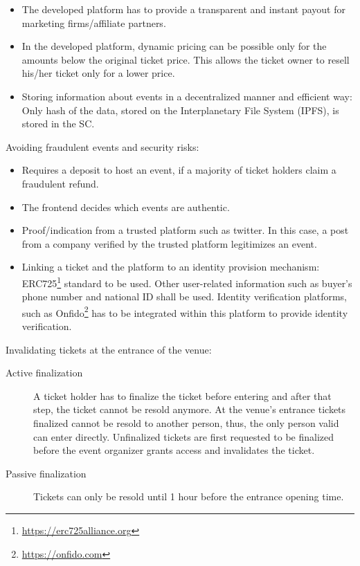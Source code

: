 \begin{itemize}
    \item The developed platform has to provide a transparent and instant payout for marketing firms/affiliate partners.
    \item In the developed platform, dynamic pricing can be possible only for the amounts below the original ticket price. This allows the ticket owner to resell his/her ticket only for a lower price.
    \item Storing information about events in a decentralized manner and efficient way: Only hash of the data, stored on the Interplanetary File System (IPFS), is stored in the SC.
\end{itemize}


Avoiding fraudulent events and security risks:  
\begin{itemize}
    \item Requires a deposit to host an event, if a majority of ticket holders claim a fraudulent refund.
    \item The frontend decides which events are authentic.
    \item Proof/indication from a trusted platform such as twitter. In this case, a post from a company verified by the trusted platform legitimizes an event.
    \item Linking a ticket and the platform to an identity provision mechanism: ERC725\footnote{\url{https://erc725alliance.org}} standard to be used. Other user-related information such as buyer's phone number and national ID shall be used. Identity verification platforms, such as Onfido\footnote{\url{https://onfido.com}} has to be integrated within this platform to provide identity verification.
\end{itemize}

Invalidating tickets at the entrance of the venue:
\begin{description}
    \item[Active finalization] A ticket holder has to finalize the ticket before entering and after that step, the ticket cannot be resold anymore. At the venue's entrance tickets finalized cannot be resold to another person, thus, the only person valid can enter directly. Unfinalized tickets are first requested to be finalized before the event organizer grants access and invalidates the ticket.
    \item[Passive finalization] Tickets can only be resold until 1 hour before the entrance opening time.
\end{description}


